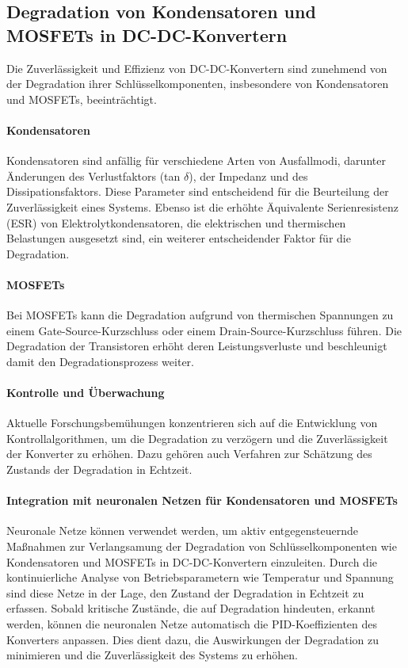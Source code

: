 \subsection{Degradation von Kondensatoren und MOSFETs in DC-DC-Konvertern}

Die Zuverlässigkeit und Effizienz von DC-DC-Konvertern sind zunehmend von der Degradation ihrer Schlüsselkomponenten, insbesondere von Kondensatoren und MOSFETs, beeinträchtigt.

\paragraph{Kondensatoren}

Kondensatoren sind anfällig für verschiedene Arten von Ausfallmodi, darunter Änderungen des Verlustfaktors (tan $\delta$), der Impedanz und des Dissipationsfaktors. Diese Parameter sind entscheidend für die Beurteilung der Zuverlässigkeit eines Systems. Ebenso ist die erhöhte Äquivalente Serienresistenz (ESR) von Elektrolytkondensatoren, die elektrischen und thermischen Belastungen ausgesetzt sind, ein weiterer entscheidender Faktor für die Degradation.\cite{jeong2023degradation}

\paragraph{MOSFETs}

Bei MOSFETs kann die Degradation aufgrund von thermischen Spannungen zu einem Gate-Source-Kurzschluss oder einem Drain-Source-Kurzschluss führen. Die Degradation der Transistoren erhöht deren Leistungsverluste und beschleunigt damit den Degradationsprozess weiter.\cite{wensdesign2022}



\paragraph{Kontrolle und Überwachung}

Aktuelle Forschungsbemühungen konzentrieren sich auf die Entwicklung von Kontrollalgorithmen, um die Degradation zu verzögern und die Zuverlässigkeit der Konverter zu erhöhen. Dazu gehören auch Verfahren zur Schätzung des Zustands der Degradation in Echtzeit.
\cite{choi2013pulsewidth}

\paragraph{Integration mit neuronalen Netzen für Kondensatoren und MOSFETs}

Neuronale Netze können verwendet werden, um aktiv entgegensteuernde Maßnahmen zur Verlangsamung der Degradation von Schlüsselkomponenten wie Kondensatoren und MOSFETs in DC-DC-Konvertern einzuleiten. Durch die kontinuierliche Analyse von Betriebsparametern wie Temperatur und Spannung sind diese Netze in der Lage, den Zustand der Degradation in Echtzeit zu erfassen. Sobald kritische Zustände, die auf Degradation hindeuten, erkannt werden, können die neuronalen Netze automatisch die PID-Koeffizienten des Konverters anpassen. Dies dient dazu, die Auswirkungen der Degradation zu minimieren und die Zuverlässigkeit des Systems zu erhöhen.
\cite{morales2020grokking}
